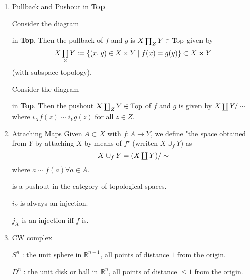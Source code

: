 \documentclass{ctexart}
\DeclareMathOperator{\Top}{Top}
\DeclareMathOperator{\pullback}{\mathsmaller{\prod}}
\DeclareMathOperator{\pushout}{\mathsmaller{\coprod}}
\begin{document}
\noindent\makebox[\linewidth]{\rule{\paperwidth}{0.4pt}}

\begin{enumerate}
\item Pullback and Pushout in \textbf{Top}

Consider the diagram
\begin{center}
\end{center}
in \textbf{Top}. Then the pullback of $f$ and $g$ is $X \pullback_Z Y \in \Top$ given by
\[
X \pullback_{Z} Y := \{(x,y) \in X \times Y \mid f(x) = g(y)\} \subset X \times Y
\]
(with subspace topology).

Consider the diagram
\begin{center}
\end{center}
in \textbf{Top}. Then the pushout $X \pushout_Z Y\in \Top$ of $f$ and $g$ is given by $X\pushout Y/\sim$ where $i_X f(z) \sim i_Y g(z)$ for all $z \in Z$.

\item Attaching Maps
Given $A\subset X$ with $f : A\to Y$, we define "the space obtained from $Y$ by attaching $X$ by means of $f$" (wrriten $X \cup_f Y$) as
\[
X\cup_f Y = (X\pushout Y)/\sim
\]
where $a\sim f(a)\forall a\in A$.
\begin{center}
\end{center}
is a pushout in the category of topological spaces.

$i_Y$ is always an injection.

$j_X$ is an injection iff $f$ is.

\item CW complex

$S^n$ : the unit sphere in $\mathbb{R}^{n+1}$, all points of distance $1$ from the origin.

$D^n$ : the unit disk or ball in $\mathbb{R}^n$, all points of distance $\leq 1$ from the origin.


\end{enumerate}
\end{document}

